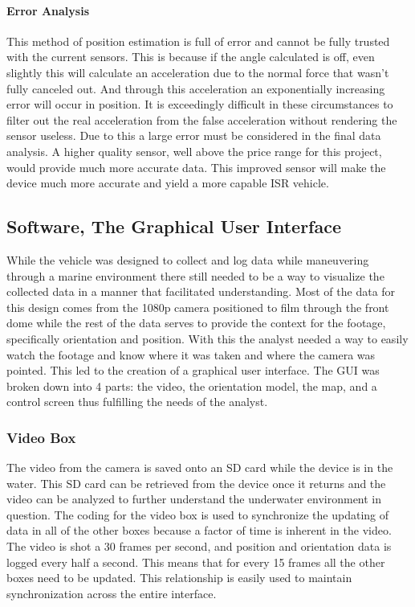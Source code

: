 \documentclass{report}
\begin{document}
\paragraph{Error Analysis} 
This method of position estimation is full of error and cannot be fully trusted with the current sensors. This is because if the angle calculated is off, even slightly this will calculate an acceleration due to the normal force that wasn't fully canceled out. And through this acceleration an exponentially increasing error will occur in position. It is exceedingly difficult in these circumstances to filter out the real acceleration from the false acceleration without rendering the sensor useless. Due to this a large error must be considered in the final data analysis. A higher quality sensor, well above the price range for this project, would provide much more accurate data. This improved sensor will make the device much more accurate and yield a more capable ISR vehicle. 
\subsection{Software, The Graphical User Interface}
While the vehicle was designed to collect and log data while maneuvering through a marine environment there still needed to be a way to visualize the collected data in a manner that facilitated understanding. Most of the data for this design comes from the 1080p camera positioned to film through the front dome while the rest of the data serves to provide the context for the footage, specifically orientation and position. With this the analyst needed a way to easily watch the footage and know where it was taken and where the camera was pointed. This led to the creation of a graphical user interface. The GUI was broken down into 4 parts: the video, the orientation model, the map, and a control screen thus fulfilling the needs of the analyst.
\subsubsection{Video Box}
The video from the camera is saved onto an SD card while the device is in the water. This SD card can be retrieved from the device once it returns and the video can be analyzed to further understand the underwater environment in question. The coding for the video box is used to synchronize the updating of data in all of the other boxes because a factor of time is inherent in the video. The video is shot a 30 frames per second, and position and orientation data is logged every half a second. This means that for every 15 frames all the other boxes need to be updated. This relationship is easily used to maintain synchronization across the entire interface.
\end{document}
